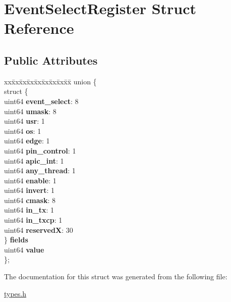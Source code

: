 \hypertarget{struct_event_select_register}{}\section{Event\+Select\+Register Struct Reference}
\label{struct_event_select_register}
\subsection*{Public Attributes}
\begin{DoxyCompactItemize}
\item 
\mbox{\label{struct_event_select_register_a0d025caf9ccb643c4ba9c67e3d1a4bbf}} 
\begin{tabbing}
xx\=xx\=xx\=xx\=xx\=xx\=xx\=xx\=xx\=\kill
union \{\\
\>struct \{\\
\>\>uint64 {\bfseries event\_select}: 8\\
\>\>uint64 {\bfseries umask}: 8\\
\>\>uint64 {\bfseries usr}: 1\\
\>\>uint64 {\bfseries os}: 1\\
\>\>uint64 {\bfseries edge}: 1\\
\>\>uint64 {\bfseries pin\_control}: 1\\
\>\>uint64 {\bfseries apic\_int}: 1\\
\>\>uint64 {\bfseries any\_thread}: 1\\
\>\>uint64 {\bfseries enable}: 1\\
\>\>uint64 {\bfseries invert}: 1\\
\>\>uint64 {\bfseries cmask}: 8\\
\>\>uint64 {\bfseries in\_tx}: 1\\
\>\>uint64 {\bfseries in\_txcp}: 1\\
\>\>uint64 {\bfseries reservedX}: 30\\
\>\} {\bfseries fields}\\
\>uint64 {\bfseries value}\\
\}; \\

\end{tabbing}\end{DoxyCompactItemize}


The documentation for this struct was generated from the following file\+:\begin{DoxyCompactItemize}
\item 
\mbox{\hyperlink{types_8h}{types.\+h}}\end{DoxyCompactItemize}
